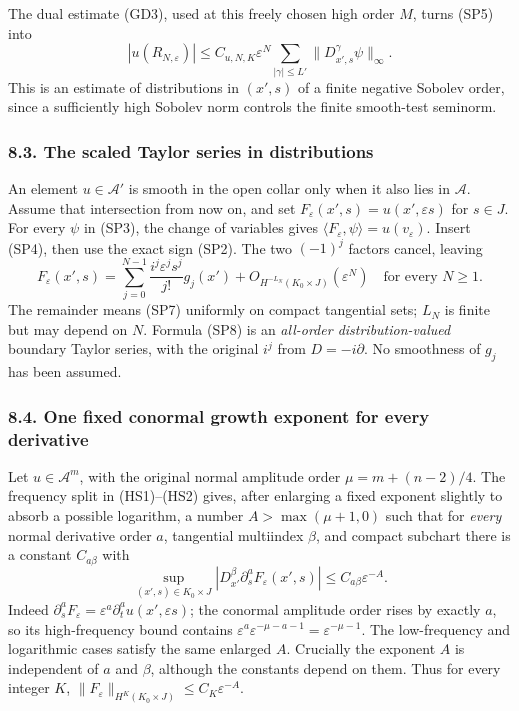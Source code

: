 \documentclass[
  11pt,
]{article}
\begin{document}
The dual estimate (GD3), used at this freely chosen high order \(M\),
turns (SP5) into \[
 |u(R_{N,\varepsilon})|
       \le C_{u,N,K}\varepsilon^N
              \sum_{|\gamma|\le L'}
                     \|D_{x',s}^\gamma\psi\|_\infty.
 \tag{SP7}
\] This is an estimate of distributions in \((x',s)\) of a finite
negative Sobolev order, since a sufficiently high Sobolev norm controls
the finite smooth-test seminorm.

\subsubsection{8.3. The scaled Taylor series in
distributions}\label{the-scaled-taylor-series-in-distributions}

An element \(u\in\mathcal A'\) is smooth in the open collar only when it
also lies in \(\mathcal A\). Assume that intersection from now on, and
set \(F_\varepsilon(x',s)=u(x',\varepsilon s)\) for \(s\in J\). For
every \(\psi\) in (SP3), the change of variables gives
\(\langle F_\varepsilon,\psi\rangle=u(v_\varepsilon)\). Insert (SP4),
then use the exact sign (SP2). The two \((-1)^j\) factors cancel,
leaving \[
 F_\varepsilon(x',s)
  =\sum_{j=0}^{N-1}
      \frac{i^j\varepsilon^j s^j}{j!}g_j(x')
        +O_{H^{-L_N}(K_0\times J)}(\varepsilon^N)
 \quad\text{for every }N\ge1.
 \tag{SP8}
\] The remainder means (SP7) uniformly on compact tangential sets;
\(L_N\) is finite but may depend on \(N\). Formula (SP8) is an
\emph{all-order distribution-valued} boundary Taylor series, with the
original \(i^j\) from \(D=-i\partial\). No smoothness of \(g_j\) has
been assumed.

\subsubsection{8.4. One fixed conormal growth exponent for every
derivative}\label{one-fixed-conormal-growth-exponent-for-every-derivative}

Let \(u\in\mathcal A^m\), with the original normal amplitude order
\(\mu=m+(n-2)/4\). The frequency split in (HS1)--(HS2) gives, after
enlarging a fixed exponent slightly to absorb a possible logarithm, a
number \(A>\max(\mu+1,0)\) such that for \emph{every} normal derivative
order \(a\), tangential multiindex \(\beta\), and compact subchart there
is a constant \(C_{a\beta}\) with \[
 \sup_{(x',s)\in K_0\times J}
  |D_{x'}^\beta\partial_s^a F_\varepsilon(x',s)|
       \le C_{a\beta}\varepsilon^{-A}.
 \tag{SP9}
\] Indeed \(\partial_s^a F_\varepsilon
=\varepsilon^a\partial_t^au(x',\varepsilon s)\); the conormal amplitude
order rises by exactly \(a\), so its high-frequency bound contains
\(\varepsilon^a\varepsilon^{-\mu-a-1}
=\varepsilon^{-\mu-1}\). The low-frequency and logarithmic cases satisfy
the same enlarged \(A\). Crucially the exponent \(A\) is independent of
\(a\) and \(\beta\), although the constants depend on them. Thus for
every integer \(K\), \(\|F_\varepsilon\|_{H^K(K_0\times J)}
\le C_K\varepsilon^{-A}\).
\end{document}
